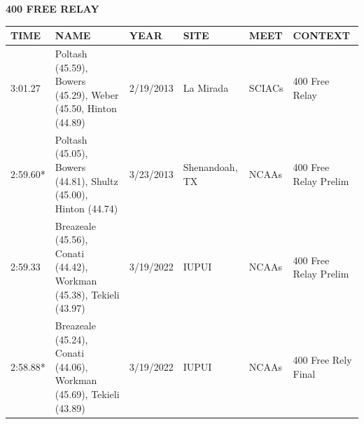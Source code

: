 \begin{table}[H]
\centering
\begin{minipage}[t]{0.6\textwidth}
\centering
\textbf{400 FREE RELAY}\\[0.1cm]
\begin{tabular}{@{}p{1.8cm}p{2.8cm}p{1.2cm}p{1.4cm}p{1.4cm}p{2.0cm}@{}}
\hline
    \textbf{TIME} & \textbf{NAME} & \textbf{YEAR} & \textbf{SITE} & \textbf{MEET} & \textbf{CONTEXT} \\
\hline
    3:01.27 & Poltash (45.59), Bowers (45.29), Weber (45.50, Hinton (44.89) & 2/19/2013 & La Mirada & SCIACs & 400 Free Relay \\
    2:59.60* & Poltash (45.05), Bowers (44.81), Shultz (45.00), Hinton (44.74) & 3/23/2013 & Shenandoah, TX & NCAAs & 400 Free Relay Prelim \\
    2:59.33 & Breazeale (45.56), Conati (44.42), Workman (45.38), Tekieli (43.97) & 3/19/2022 & IUPUI & NCAAs & 400 Free Relay Prelim \\
    2:58.88* & Breazeale (45.24), Conati (44.06), Workman (45.69), Tekieli (43.89) & 3/19/2022 & IUPUI & NCAAs & 400 Free Rely Final \\
\hline
\end{tabular}
\end{minipage}
\end{table}

